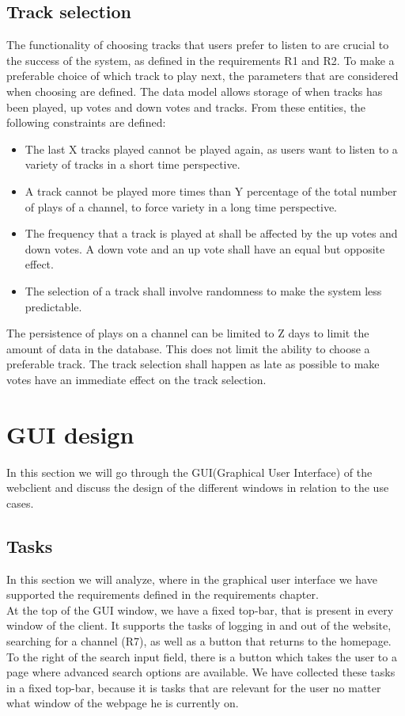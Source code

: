 \documentclass[a4paper,11pt,report]{article}
\begin{document}
{\subsection{Track selection}
The functionality of choosing tracks that users prefer to listen to are crucial to the success of the system, as defined in the requirements R1 and R2. To make a preferable choice of which track to play next, the parameters that are considered when choosing are defined. The data model allows storage of when tracks has been played, up votes and down votes and tracks. From these entities, the following constraints are defined:
\begin{itemize}
\item The last X tracks played cannot be played again, as users want to listen to a variety of tracks in a short time perspective.
\item A track cannot be played more times than Y percentage of the total number of plays of a channel, to force variety in a long time perspective.
\item The frequency that a track is played at shall be affected by the up votes and down votes. A down vote and an up vote shall have an equal but opposite effect.
\item The selection of a track shall involve randomness to make the system less predictable.
\end{itemize}
The persistence of plays on a channel can be limited to Z days to limit the amount of data in the database. This does not limit the ability to choose a preferable track. The track selection shall happen as late as possible to make votes have an immediate effect on the track selection. 

\section{GUI design}
In this section we will go through the GUI(Graphical User Interface) of the webclient and discuss the design of the different windows in relation to the use cases.

\subsection{Tasks}
In this section we will analyze, where in the graphical user interface we have supported the requirements defined in the requirements chapter.\\

At the top of the GUI window, we have a fixed top-bar, that is present in every window of the client. It supports the tasks of logging in and out of the website, searching for a channel (R7), as well as a button that returns to the homepage. To the right of the search input field, there is a button which takes the user to a page where advanced search options are available. We have collected these tasks in a fixed top-bar, because it is tasks that are relevant for the user no matter what window of the webpage he is currently on.\\

}
\end{document}
